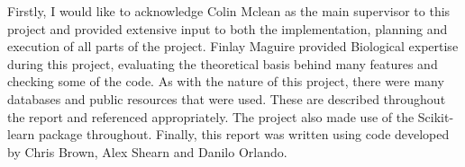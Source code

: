 \begin{acknowledgements}
    Firstly, I would like to acknowledge Colin Mclean as the main supervisor to this project and provided extensive input to both the implementation, planning and execution of all parts of the project.
    Finlay Maguire provided Biological expertise during this project, evaluating the theoretical basis behind many features and checking some of the code.
    As with the nature of this project, there were many databases and public resources that were used.
    These are described throughout the report and referenced appropriately.
    The project also made use of the Scikit-learn\autocite{pedregosa_scikit-learn:_2011} package throughout.
    Finally, this report was written using code developed by Chris Brown, Alex Shearn and Danilo Orlando.

\end{acknowledgements}
